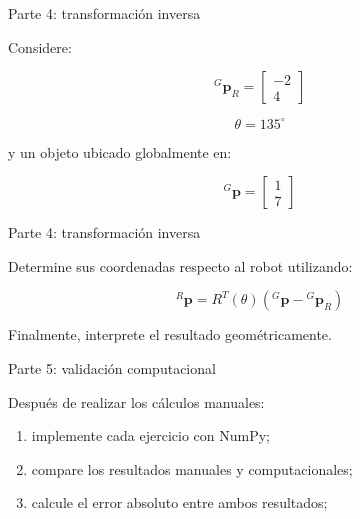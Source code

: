 \documentclass[aspectratio=169]{beamer}
\begin{document}
\begin{frame}{Parte 4: transformación inversa}

    Considere:

    \[
    {}^{G}\mathbf{p}_R
    =
    \begin{bmatrix}
        -2\\
        4
    \end{bmatrix}
    \]

    \[
    \theta=135^\circ
    \]

    y un objeto ubicado globalmente en:

    \[
    {}^{G}\mathbf{p}
    =
    \begin{bmatrix}
        1\\
        7
    \end{bmatrix}
    \]

\end{frame}

\begin{frame}{Parte 4: transformación inversa}

    Determine sus coordenadas respecto al robot utilizando:

    \[
    {}^{R}\mathbf{p}
    =
    R^T(\theta)
    \left(
    {}^{G}\mathbf{p}
    -
    {}^{G}\mathbf{p}_R
    \right)
    \]

    \vspace{0.3cm}

    Finalmente, interprete el resultado geométricamente.

\end{frame}

\begin{frame}{Parte 5: validación computacional}

    Después de realizar los cálculos manuales:

    \begin{enumerate}
        \item implemente cada ejercicio con NumPy;
        \item compare los resultados manuales y computacionales;
        \item calcule el error absoluto entre ambos resultados;
    \end{enumerate}

\end{frame}
\end{document}
